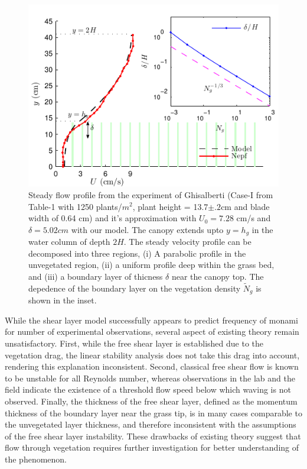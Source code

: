 \documentclass[aps,prl,reprint,twocolumn,showpacs,superscriptaddress,10pt]{revtex4-1}  %
\newcommand{\Ndg}{\tilde{N}_g}
\begin{document}
\begin{figure}
\includegraphics[scale=1]{Grass_Base_Nepf_shear}
\caption{Steady flow profile from the experiment of Ghisalberti\cite{Nepf04} (Case-I from Table-1 with 1250 plants/$m^2$, 
plant height = 13.7$\pm .2$cm and blade width of 0.64 cm)
 and it's approximation with $U_0=7.28$ cm/s and $\delta = 5.02cm$ with our model. The canopy extends upto $y=h_g$ in the water column of depth $2H$. 
The steady velocity profile can be decomposed into three regions, (i) A parabolic profile in the unvegetated region, (ii) a uniform profile deep within the grass bed, and (iii) a boundary layer of thicness $\delta$ near the canopy top. 
The depedence of the boundary layer on the vegetation density $\Ndg$ is shown in the inset.}
\label{basicflow}
\end{figure}

While the shear layer model successfully appears to predict frequency of monami for number of experimental observations, several aspect of existing theory remain unsatisfactory. 
First, while the free shear layer is established due to the vegetation drag, the linear stability analysis\cite{Raupach96} does not take this drag into account, rendering this explanation inconsistent. 
Second, classical free shear flow is known to be unstable for all Reynolds number\cite{drazin}, whereas observations in the lab\cite{Ghisal02} and the field\cite{Grizzle96} indicate the existence of a threshold 
flow speed below which waving is not observed. 
Finally, the thickness of the free shear layer, defined as the momentum thickness of the boundary layer near the grass tip, is in many cases comparable to the unvegetated layer thickness,
and therefore inconsistent with the assumptions of the free shear layer instability. 
These drawbacks of existing theory suggest that flow through vegetation requires further investigation for better understanding of the phenomenon.
\end{document}
